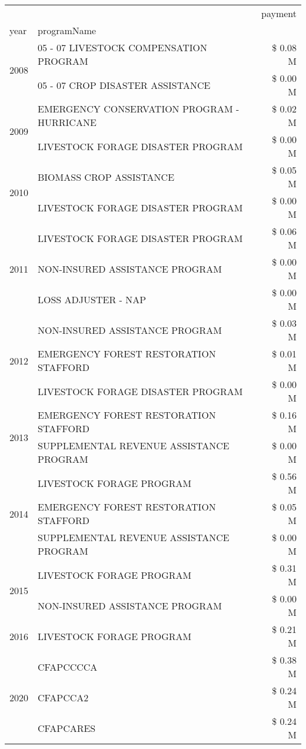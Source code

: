 \begin{tabular}{llr}
\toprule
 &  & payment \\
year & programName &  \\
\midrule
\multirow[t]{2}{*}{2008} & 05 - 07 LIVESTOCK COMPENSATION PROGRAM & \$ 0.08 M \\
 & 05 - 07 CROP DISASTER ASSISTANCE & \$ 0.00 M \\
\cline{1-3}
\multirow[t]{2}{*}{2009} & EMERGENCY CONSERVATION PROGRAM - HURRICANE & \$ 0.02 M \\
 & LIVESTOCK FORAGE DISASTER  PROGRAM & \$ 0.00 M \\
\cline{1-3}
\multirow[t]{2}{*}{2010} & BIOMASS CROP ASSISTANCE & \$ 0.05 M \\
 & LIVESTOCK FORAGE DISASTER  PROGRAM & \$ 0.00 M \\
\cline{1-3}
\multirow[t]{3}{*}{2011} & LIVESTOCK FORAGE DISASTER PROGRAM & \$ 0.06 M \\
 & NON-INSURED ASSISTANCE PROGRAM & \$ 0.00 M \\
 & LOSS ADJUSTER - NAP & \$ 0.00 M \\
\cline{1-3}
\multirow[t]{3}{*}{2012} & NON-INSURED ASSISTANCE PROGRAM & \$ 0.03 M \\
 & EMERGENCY FOREST RESTORATION STAFFORD & \$ 0.01 M \\
 & LIVESTOCK FORAGE DISASTER PROGRAM & \$ 0.00 M \\
\cline{1-3}
\multirow[t]{2}{*}{2013} & EMERGENCY FOREST RESTORATION STAFFORD & \$ 0.16 M \\
 & SUPPLEMENTAL REVENUE ASSISTANCE PROGRAM & \$ 0.00 M \\
\cline{1-3}
\multirow[t]{3}{*}{2014} & LIVESTOCK FORAGE PROGRAM & \$ 0.56 M \\
 & EMERGENCY FOREST RESTORATION STAFFORD & \$ 0.05 M \\
 & SUPPLEMENTAL REVENUE ASSISTANCE PROGRAM & \$ 0.00 M \\
\cline{1-3}
\multirow[t]{2}{*}{2015} & LIVESTOCK FORAGE PROGRAM & \$ 0.31 M \\
 & NON-INSURED ASSISTANCE PROGRAM & \$ 0.00 M \\
\cline{1-3}
2016 & LIVESTOCK FORAGE PROGRAM & \$ 0.21 M \\
\cline{1-3}
\multirow[t]{3}{*}{2020} & CFAPCCCCA & \$ 0.38 M \\
 & CFAPCCA2 & \$ 0.24 M \\
 & CFAPCARES & \$ 0.24 M \\
\cline{1-3}
\bottomrule
\end{tabular}
